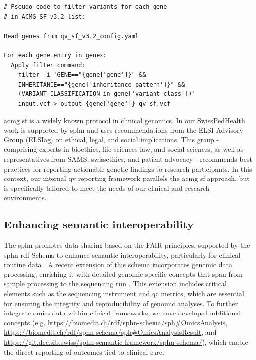 \begin{tcolorbox}[
    breakable,  %
    colback=white!0,  %
    colframe=black,  %
    boxrule=1pt,  %
    arc=1mm,  %
    outer arc=1mm,
    title=\textbf{\refstepcounter{myboxcounter}\label{box:qv_variables_example_sf2}Box \themyboxcounter: Filtering command for QV SF}
]
\begin{verbatim}
# Pseudo-code to filter variants for each gene 
# in ACMG SF v3.2 list:

Read genes from qv_sf_v3.2_config.yaml

For each gene entry in genes:
  Apply filter command:
    filter -i 'GENE=="{gene['gene']}" && 
    INHERITANCE=="{gene['inheritance_pattern']}" && 
    (VARIANT_CLASSIFICATION in gene['variant_class'])' 
    input.vcf > output_{gene['gene']}_qv_sf.vcf
\end{verbatim}
\end{tcolorbox}

\ac{acmg} \ac{sf} is a widely known protocol in clinical genomics. 
In our SwissPedHealth work is supported by \ac{sphn} and uses recommendations from the ELSI Advisory Group (ELSIag) on ethical, legal, and social implications. 
This group - comprising experts in bioethics, life sciences law, and social sciences, as well as representatives from SAMS, swissethics, and patient advocacy - recommends best practices for reporting actionable genetic findings to research participants.
In this context, our internal \ac{qv} reporting framework parallels the \ac{acmg} \ac{sf} approach, but is specifically tailored to meet the needs of our clinical and research environments.

\subsection{Enhancing semantic interoperability}
\label{semantic}
The \ac{sphn} promotes data sharing based on the FAIR principles, supported by the \ac{sphn} \ac{rdf} Schema to enhance semantic interoperability, particularly for clinical routine data \cite{wilkinson2016fair, toure2023fairification}. 
A recent extension of this schema incorporates genomic data processing, enriching it with detailed genomic-specific concepts that span from sample processing to the sequencing run \cite{van2023bridging}. 
This extension includes critical elements such as the sequencing instrument and \ac{qc} metrics, which are essential for ensuring the integrity and reproducibility of genomic analyses. 
To further integrate omics data within clinical frameworks, we have developed additional concepts (e.g. \url{https://biomedit.ch/rdf/sphn-schema/sph#OmicsAnalysis}, \url{https://biomedit.ch/rdf/sphn-schema/sph#OmicsAnalysisResult}, and \url{https://git.dcc.sib.swiss/sphn-semantic-framework/sphn-schema/}), which enable the direct reporting of outcomes tied to clinical care.

